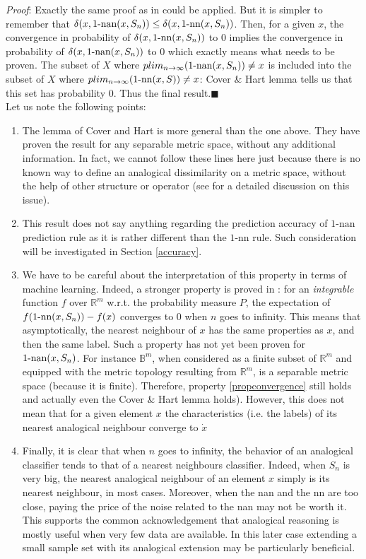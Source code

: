 {\it Proof}:
Exactly the same proof  as in \cite{CovHarTIT67} could be applied.  But it is
simpler to remember that $\delta(x, 1\mbox{-nan}(x,S_n)) \leq \delta(x, 1\mbox{-nn}(x,S_n))$. Then,
for a given $x$, the convergence in probability of $\delta(x,
1\mbox{-nn}(x,S_n))$ to $0$ implies the convergence in probability of $\delta(x,
1\mbox{-nan}(x,S_n))$ to $0$ which exactly means what needs to be proven.
The subset of $X$ where $plim_{n \to \infty}(1\mbox{-nan}(x,S_n))\neq
x$ is included into the subset of $X$ where $plim_{n \to \infty}(1\mbox{-nn}(x,S))\neq x$:
Cover \& Hart lemma tells us that this set has probability $0$. Thus the final
result.\hfill $\blacksquare$\\

Let us note the following points:
\begin{enumerate}
\item The lemma of Cover and Hart is more general than the one above. They have
  proven the result for any separable metric space, without any additional
  information. In fact, we cannot follow these lines here just because there is
  no known way to define an analogical dissimilarity on a metric space, without
  the help of other structure or operator (see \cite{MicBayDelJAIR08} for a
  detailed discussion on this issue).
\item This result does not say anything regarding the prediction accuracy of
  $1\mbox{-nan}$ prediction rule as it is rather different than the
  $1\mbox{-nn}$ rule. Such consideration will be investigated in Section
  \ref{accuracy}.
\item We have to be careful about the interpretation of this property in terms
  of machine learning. Indeed, a stronger property is proved in
  \cite{CovHarTIT67}: for an {\it integrable} function $f$  over $\mathbb{R}^m$
  w.r.t. the probability measure $P$, the expectation of
  $f(1\mbox{-nn}(x,S_n))- f(x)$ converges to 0 when $n$ goes to infinity.
  This means that asymptotically, the nearest neighbour of $x$ has the same
  properties as $x$, and then the same label. Such a property has not yet been
  proven for $1\mbox{-nan}(x, S_n)$.
  For instance $\mathbb{B}^m$, when considered as a finite
  subset of $\mathbb{R}^m$ and equipped with the metric topology resulting from
  $\mathbb{R}^m$, is a separable metric space (because it is finite).
  Therefore, property \ref{propconvergence} still holds and actually even the
  Cover \& Hart lemma holds). However, this does not mean that for a given
  element $x$ the characteristics (i.e. the labels) of its nearest analogical
  neighbour converge to $\dot{x}$
\item Finally, it is clear that when $n$ goes to infinity, the behavior of an
  analogical classifier tends to that of a nearest neighbours classifier.
  Indeed, when $S_n$ is very big, the nearest analogical neighbour of an
  element $x$ simply is its nearest neighbour, in most cases. Moreover, when
  the nan and the nn are too close, paying the price of the noise related to
  the nan may not be worth it. This supports the common acknowledgement that
  analogical reasoning is mostly useful when very few data are available.
    In this later case extending a small sample set with its analogical
    extension may be particularly beneficial.




\end{enumerate}
